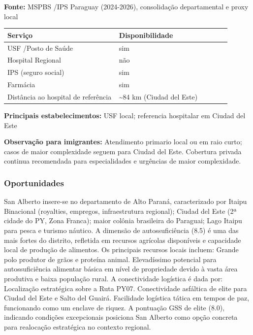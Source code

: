 \textbf{Fonte:} MSPBS /\allowbreak  IPS Paraguay (2024-2026), consolidação
departamental e proxy local

{\def\LTcaptype{none} %
\begin{longtable}{@{}>{\raggedright\arraybackslash}p{0.45\linewidth} >{\raggedright\arraybackslash}p{0.45\linewidth}@{}}
\toprule\noalign{}
Serviço & Disponibilidade \\
\midrule\noalign{}
\endhead
\bottomrule\noalign{}
\endlastfoot
USF /\allowbreak  Posto de Saúde & sim \\
Hospital Regional & não \\
IPS (seguro social) & sim \\
Farmácia & sim \\
Distância ao hospital de referência & \textasciitilde84 km (Ciudad del
Este) \\
\end{longtable}
}

\textbf{Principais estabelecimentos:} USF local; referencia hospitalar
em Ciudad del Este

\textbf{Observação para imigrantes:} Atendimento primario local ou em
raio curto; casos de maior complexidade seguem para Ciudad del Este.
Cobertura privada continua recomendada para especialidades e urgências
de maior complexidade.
\newpage

\subsubsection*{Oportunidades}\label{oport-san-alberto-1018}
San Alberto insere-se no departamento de Alto Paraná, caracterizado por Itaipu Binacional (royalties, empregos, infraestrutura regional); Ciudad del Este (2ª cidade do PY, Zona Franca); maior colônia brasileira do Paraguai; Lago Itaipu para pesca e turismo náutico. A dimensão de autossuficiência (8.5) é uma das mais fortes do distrito, refletida em recursos agrícolas disponíveis e capacidade local de produção de alimentos. Os principais recursos locais incluem: Grande polo produtor de grãos e proteína animal. Elevadíssimo potencial para autossuficiência alimentar básica em nível de propriedade devido à vasta área produtiva e baixa população rural. A conectividade logística é dada por: Localização estratégica sobre a Ruta PY07. Conectividade asfáltica de elite para Ciudad del Este e Salto del Guairá. Facilidade logística tática em tempos de paz, funcionando como um enclave de riquez. A pontuação GSS de elite (8.0), indicando condições excepcionais posiciona San Alberto como opção concreta para realocação estratégica no contexto regional.


